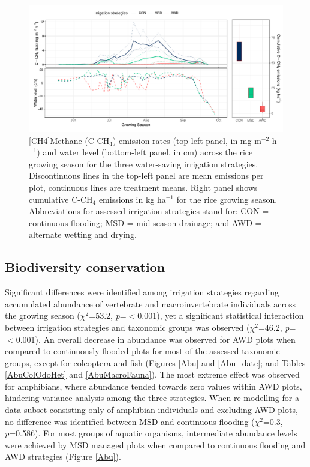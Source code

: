 \begin{figure} [ht]
\captionsetup{justification=justified}
	\centering 
	\includegraphics[scale=0.65, center]{Figures/Chapter_1/CH4_flux_water_acc.pdf}
	[CH4]{Methane (C-CH$_{4}$) emission rates (top-left panel, in mg m$^{-2}$ h$^{-1}$) and water level (bottom-left panel, in cm) across the rice growing season for the three water-saving irrigation strategies. Discontinuous lines in the top-left panel are mean emissions per plot, continuous lines are treatment means. Right panel shows cumulative C-CH$_{4}$ emissions in kg ha$^{-1}$ for the  rice growing season. Abbreviations for assessed irrigation strategies stand for: CON = continuous flooding; MSD = mid-season drainage; and AWD = alternate wetting and drying.}  
	\label{CH4_acc}
\end{figure}

\subsection{Biodiversity conservation} 

 Significant differences were identified among irrigation strategies regarding accumulated abundance of vertebrate and macroinvertebrate individuals across the growing season ($\chi^2$=53.2, \textit{p}=$<$0.001), yet a significant statistical interaction between irrigation strategies and taxonomic groups was observed ($\chi^2$=46.2, \textit{p}=$<$0.001). An overall decrease in abundance was observed for AWD plots when compared to continuously flooded plots for most of the assessed taxonomic groups, except for coleoptera and fish (Figures \ref{Abu} and \ref{Abu_date}; and Tables \ref{AbuColOdoHet} and \ref{AbuMacroFauna}). The most extreme effect was observed for amphibians, where abundance tended towards zero values within AWD plots, hindering variance analysis among the three strategies. When re-modelling for a data subset consisting only of amphibian individuals and excluding AWD plots, no difference was identified between MSD and continuous flooding ($\chi^2$=0.3, \textit{p}=0.586). For most groups of aquatic organisms, intermediate abundance levels were achieved by MSD managed plots when compared to continuous flooding and AWD strategies (Figure \ref{Abu}).\\

